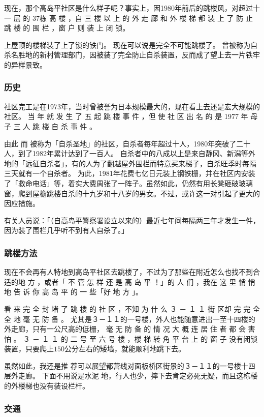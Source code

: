 \documentclass[UTF8]{ctexart}
\begin{document}
现在，那个高岛平社区是什么样子呢？事实上，因1980年前后的跳楼风，对超过十一 层 的 $37$栋 高 楼 ，自 三 楼 以 上 的 外 走 廊 和 外 楼 梯 都 装 上 了 防 止 跳 楼 的 围 栏 ，窗 户 则 装 上 闭 锁。

上屋顶的楼梯装了上了锁的铁门。
现在可以说是完全不可能跳楼了。
曾被称为自杀名胜地的新村管理部门，因被装了完全防止自杀装置，反而成了望上去一片铁牢的异样景致。

\subsubsection{历史}

社区完工是在1973年，当时曾被誉为日本规模最大的，现在看上去还是宏大规模的社区。 
当 年 就 发 生 了 五 起 跳 楼 事 件 ，但 使 社 区 出 名 的 是 1977 年 母 子 三 人 跳 楼 自 杀 事 件 。

由此 而 被称为「自杀圣地」的社区，自杀者每年超过十人，1980年突破了二十人，到了1982年累计达到了一百人。 
自杀者中的八成以上是来自静冈、新潟等外地的「远征自杀者」，有的人为了翻越屋外围栏而特意买来梯子，自杀旺季时每隔三天就有一个自杀者。
为此，1981年花费七亿日元装上钢铁栅，并在社区内安装了「救命电话」等，着实大费周张了一阵子。虽然如此，仍然有用长凳砸破玻璃窗，爬到屋檐跳楼自杀的十九岁和十八岁的男女。不过，或许这一对引起了更大的因应措施。

有关人员说：「（自高岛平警察署设立以来的）最近七年间每隔两三年才发生一件，因为装了围栏几乎听不到有人自杀了。」

\subsubsection{跳楼方法}

现在不会再有人特地到高岛平社区去跳楼了，不过为了那些在附近怎么也找不到合适的地
方 ，或者「 不 管 怎 样 还 是 高 岛 平 ！」的 人 们 ，我在 这 里 悄 悄 地 告 诉 你 高 岛 平 的 一 些「好 地 方 」。

看 来 完 全 封 堵 了 跳 楼 的 社 区 ，不知 为 什 么 ３ － １ １ 街 区却 完 完 全 全 地 毫 无 防 备 。 
尤其是３－１１的一号楼，外人也能随意进出一至十四楼的外走廊，只有一公尺高的低栅， 毫 无 防 备 的 情 况 大 概 连 居 住 者 都 会 害 怕 。
３ － １ １ 的 二 号  至  六 号 楼 ，楼 梯 转 角 平 台 上 的 窗 子 没有闭锁装置，只要爬上$150$公分左右的矮墙，就能顺利地跳下去。

虽然如此，我还是推 荐可以展望都营线对面板桥区街景的３－１１的一号楼十四层外走廊。
下面不用说是水泥 地，行人也少，摔下去肯定必死无疑，而且这栋楼的外楼梯也没有装设栏杆。

\subsubsection{交通}
\end{document}
